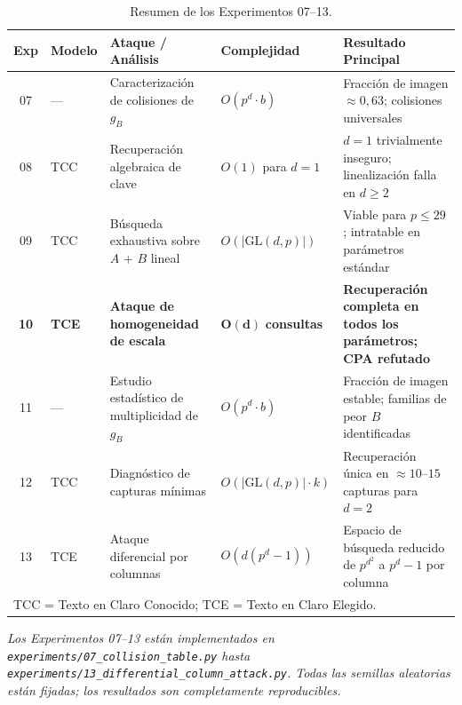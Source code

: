 \documentclass[12pt,a4paper]{article}
\theoremstyle{definition}
\newcommand{\GL}{\mathrm{GL}}
\begin{document}
\begin{table}[h]
\centering
\caption{Resumen de los Experimentos 07--13.}
\label{tab:resumen}
\renewcommand{\arraystretch}{1.35}
\begin{tabularx}{\linewidth}{c l l l X}
\toprule
Exp & Modelo & Ataque / Análisis & Complejidad & Resultado Principal \\
\midrule
07 & ---  & Caracterización de colisiones de $g_B$
           & $O(p^d \cdot b)$
           & Fracción de imagen $\approx 0{,}63$; colisiones universales \\
08 & TCC  & Recuperación algebraica de clave
           & $O(1)$ para $d{=}1$
           & $d{=}1$ trivialmente inseguro; linealización falla en $d{\geq}2$ \\
09 & TCC  & Búsqueda exhaustiva sobre $A$ + $B$ lineal
           & $O(|\GL(d,p)|)$
           & Viable para $p \leq 29$; intratable en parámetros estándar \\
\textbf{10} & \textbf{TCE}
           & \textbf{Ataque de homogeneidad de escala}
           & $\bm{O(d)}$ \textbf{consultas}
           & \textbf{Recuperación completa en todos los parámetros; CPA refutado} \\
11 & ---  & Estudio estadístico de multiplicidad de $g_B$
           & $O(p^d \cdot b)$
           & Fracción de imagen estable; familias de peor $B$ identificadas \\
12 & TCC  & Diagnóstico de capturas mínimas
           & $O(|\GL(d,p)| \cdot k)$
           & Recuperación única en $\approx 10$--$15$ capturas para $d{=}2$ \\
13 & TCE  & Ataque diferencial por columnas
           & $O(d(p^d{-}1))$
           & Espacio de búsqueda reducido de $p^{d^2}$ a $p^d{-}1$ por columna \\
\bottomrule
\multicolumn{5}{l}{\small TCC = Texto en Claro Conocido; \quad TCE = Texto en Claro Elegido.}
\end{tabularx}
\end{table}

\bigskip
\noindent
\textit{Los Experimentos 07--13 están implementados en
\texttt{experiments/07\_collision\_table.py} hasta
\texttt{experiments/13\_differential\_column\_attack.py}.
Todas las semillas aleatorias están fijadas; los resultados son
completamente reproducibles.}
\end{document}
